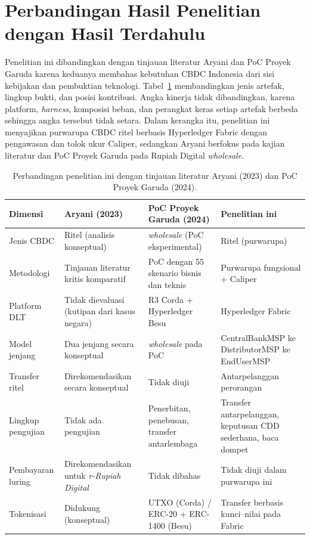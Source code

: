 \section{Perbandingan Hasil Penelitian dengan Hasil Terdahulu}

Penelitian ini dibandingkan dengan tinjauan literatur Aryani
\cite{aryani2023critlit} dan PoC Proyek Garuda \cite{bi_garuda_poc} karena
keduanya membahas kebutuhan CBDC Indonesia dari sisi kebijakan dan pembuktian
teknologi. Tabel~\ref{tab:perbandingan-cbdc} membandingkan jenis artefak,
lingkup bukti, dan posisi kontribusi. Angka kinerja tidak dibandingkan, karena
platform, \textit{harness}, komposisi beban, dan perangkat keras setiap artefak
berbeda sehingga angka tersebut tidak setara. Dalam kerangka itu,
penelitian ini menyajikan purwarupa CBDC ritel berbasis Hyperledger Fabric
dengan pengawasan dan tolok ukur Caliper, sedangkan Aryani berfokus pada kajian
literatur dan PoC Proyek Garuda pada Rupiah Digital \textit{wholesale}.

\begin{table}[H]
    \caption{Perbandingan penelitian ini dengan tinjauan literatur Aryani (2023) dan PoC Proyek Garuda (2024).}
    \label{tab:perbandingan-cbdc}
    \centering
    \scriptsize
    \begin{tabular}{@{}p{2.5cm}p{3.5cm}p{3.5cm}p{3.5cm}@{}}
        \toprule
        \textbf{Dimensi} & \textbf{Aryani (2023)} & \textbf{PoC Proyek Garuda (2024)} & \textbf{Penelitian ini} \\
        \midrule
        Jenis CBDC & Ritel (analisis konseptual) & \textit{wholesale} (PoC eksperimental) & Ritel (purwarupa) \\
        Metodologi & Tinjauan literatur kritis komparatif & PoC dengan 55 skenario bisnis dan teknis & Purwarupa fungsional + Caliper \\
        Platform DLT & Tidak dievaluasi (kutipan dari kasus negara) & R3 Corda + Hyperledger Besu & Hyperledger Fabric \\
        Model jenjang & Dua jenjang secara konseptual & \textit{wholesale} pada PoC & CentralBankMSP ke DistributorMSP ke EndUserMSP \\
        Transfer ritel & Direkomendasikan secara konseptual & Tidak diuji & Antarpelanggan perorangan \\
        Lingkup pengujian & Tidak ada pengujian & Penerbitan, penebusan, transfer antarlembaga & Transfer antarpelanggan, keputusan CDD sederhana, baca dompet \\
        Pembayaran luring & Direkomendasikan untuk \textit{r-Rupiah Digital} & Tidak dibahas & Tidak diuji dalam purwarupa ini \\
        Tokenisasi & Didukung (konseptual) & UTXO (Corda) / ERC-20 + ERC-1400 (Besu) & Transfer berbasis kunci--nilai pada Fabric \\
        \bottomrule
    \end{tabular}
\end{table}

